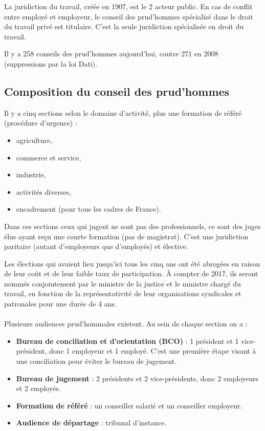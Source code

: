 La juridiction du travail, créée en 1907, est le 2 acteur public.
En cas de conflit entre employé et employeur, le conseil des prud’hommes spécialisé dans le droit du travail privé est titulaire.
C'est la seule juridiction spécialisée en droit du travail.

Il y a 258 conseils des prud'hommes aujourd'hui, contre 271 en 2008 (suppressions par la loi Dati).

\subsection{Composition du conseil des prud’hommes}

	Il y a cinq sections selon le domaine d'activité, plus une formation de référé (procédure d'urgence) :
	\begin{itemize}
		\item[\textbullet] agriculture,
		\item[\textbullet] commerce et service,
		\item[\textbullet] industrie,
		\item[\textbullet] activités diverses,
		\item[\textbullet] encadrement (pour tous les cadres de France).
	\end{itemize}
	
	Dans ces sections ceux qui jugent ne sont pas des professionnels, ce sont des juges élus ayant reçu une courte formation (pas de magistrat).
	C'est une juridiction paritaire (autant d'employeurs que d'employés) et élective.
	
	Les élections qui avaient lieu jusqu'ici tous les cinq ans ont été abrogées en raison de leur coût et de leur faible taux de participation.
	À compter de 2017, ils seront nommés conjointement par le ministre de la justice et le ministre chargé du travail, en fonction de la représentativité de leur organisations syndicales et patronales pour une durée de 4 ans.

	\paragraph{}
	Plusieurs audiences prud’hommales existent.
	Au sein de chaque section on a :
	\begin{itemize}
		\item[\textbullet] \textbf{Bureau de conciliation et d'orientation (BCO)} : 1 président et 1 vice-président, donc 1 employeur et 1 employé.
			C'est une première étape visant à une conciliation pour éviter le bureau de jugement.
		\item[\textbullet] \textbf{Bureau de jugement} : 2 présidents et 2 vice-présidents, donc 2 employeurs et 2 employés.
		\item[\textbullet] \textbf{Formation de référé} : un conseiller salarié et un conseiller employeur.
		\item[\textbullet] \textbf{Audience de départage} : tribunal d'instance.
	\end{itemize}
	
